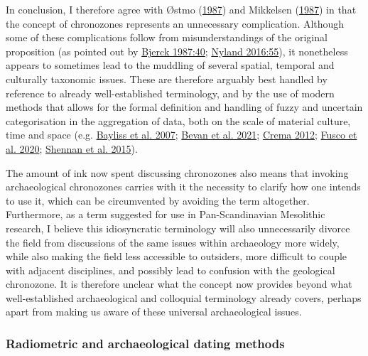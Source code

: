 \documentclass[
  a4paper,
  oneside]{uiophdthesis}
\begin{document}
In conclusion, I therefore agree with Østmo (\protect\hyperlink{ref-uxf8stmo1987}{1987}) and Mikkelsen (\protect\hyperlink{ref-mikkelsen1987}{1987}) in that the concept of chronozones represents an unnecessary complication. Although some of these complications follow from misunderstandings of the original proposition (as pointed out by \protect\hyperlink{ref-bjerck1987}{Bjerck 1987:40}; \protect\hyperlink{ref-nyland2016}{Nyland 2016:55}), it nonetheless appears to sometimes lead to the muddling of several spatial, temporal and culturally taxonomic issues. These are therefore arguably best handled by reference to already well-established terminology, and by the use of modern methods that allows for the formal definition and handling of fuzzy and uncertain categorisation in the aggregation of data, both on the scale of material culture, time and space (e.g. \protect\hyperlink{ref-bayliss2007}{Bayliss et al. 2007}; \protect\hyperlink{ref-bevan2021}{Bevan et al. 2021}; \protect\hyperlink{ref-crema2012}{Crema 2012}; \protect\hyperlink{ref-fusco2020}{Fusco et al. 2020}; \protect\hyperlink{ref-shennan2015}{Shennan et al. 2015}).

The amount of ink now spent discussing chronozones also means that invoking archaeological chronozones carries with it the necessity to clarify how one intends to use it, which can be circumvented by avoiding the term altogether. Furthermore, as a term suggested for use in Pan-Scandinavian Mesolithic research, I believe this idiosyncratic terminology will also unnecessarily divorce the field from discussions of the same issues within archaeology more widely, while also making the field less accessible to outsiders, more difficult to couple with adjacent disciplines, and possibly lead to confusion with the geological chronozone. It is therefore unclear what the concept now provides beyond what well-established archaeological and colloquial terminology already covers, perhaps apart from making us aware of these universal archaeological issues.

\hypertarget{radiometric-and-archaeological-dating-methods}{%
\subsubsection{Radiometric and archaeological dating methods}\label{radiometric-and-archaeological-dating-methods}}
\end{document}
